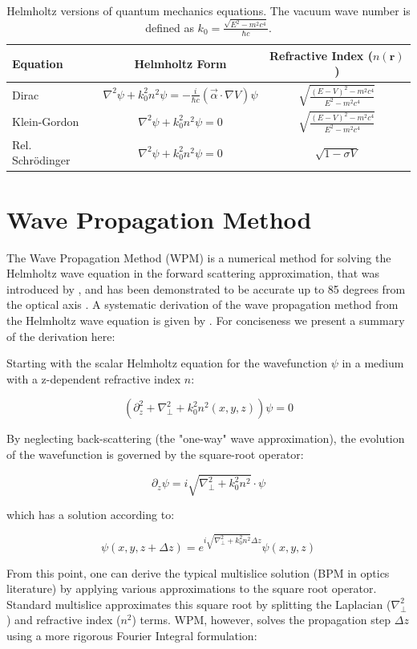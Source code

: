\documentclass{article}
\begin{document}
\begin{table}[h]
\centering
\label{tab:helmholtz_versions}
\renewcommand{\arraystretch}{2.2}
\begin{tabular}{|l|c|c|}
\hline
\textbf{Equation} & \textbf{Helmholtz Form} & \textbf{Refractive Index} ($n(\mathbf{r})$) \\
\hline
Dirac & $\nabla^2 \psi + k_0^2 n^2 \psi = - \frac{i}{\hbar c} (\vec{\alpha} \cdot \nabla V) \psi$ & $\sqrt{\frac{(E-V)^2 - m^2c^4}{E^2 - m^2c^4}}$ \\
\hline
Klein-Gordon & $\nabla^2 \psi + k_0^2 n^2 \psi = 0$ & $\sqrt{\frac{(E-V)^2 - m^2c^4}{E^2 - m^2c^4}}$ \\
\hline
Rel. Schrödinger & $\nabla^2 \psi + k_0^2 n^2 \psi = 0$ & $\sqrt{1 - \sigma V}$ \\
\hline
\end{tabular}
\caption{Helmholtz versions of quantum mechanics equations. The vacuum wave number is defined as $k_0 = \frac{\sqrt{E^2 - m^2c^4}}{\hbar c}$.}
\end{table}

\section{Wave Propagation Method}
The Wave Propagation Method (WPM) is a numerical method for solving the Helmholtz wave equation in the forward scattering approximation, that was introduced by \cite{Brenner1994}, and has been demonstrated 
to be accurate up to 85 degrees from the optical axis \cite{????}. A systematic derivation of the wave propagation method from the Helmholtz wave equation is given by \cite{Schmidt}. For conciseness
we present a summary of the derivation here:

Starting with the scalar Helmholtz equation for the wavefunction $\psi$ in a medium with a z-dependent refractive index $n$:

$$(\partial_z^2 + \nabla_\perp^2 + k_0^2 n^2(x,y,z)) \psi = 0$$

By neglecting back-scattering (the "one-way" wave approximation), 
the evolution of the wavefunction is governed by the square-root operator:

$$\partial_z \psi = i \sqrt{\nabla_\perp^2 + k_0^2 n^2} \cdot \psi$$

which has a solution according to: 

$$\psi(x,y, z+\Delta z) = e^{i \sqrt{\nabla_\perp^2 + k_0^2 n^2} \Delta z} \psi(x,y,z)$$

From this point, one can derive the typical multislice solution (BPM in optics literature) by applying various approximations to the square root operator.
Standard multislice approximates this square root by splitting the Laplacian ($\nabla_\perp^2$) and refractive index ($n^2$) terms. 
WPM, however, solves the propagation step $\Delta z$ using a more rigorous Fourier Integral formulation:
\end{document}

